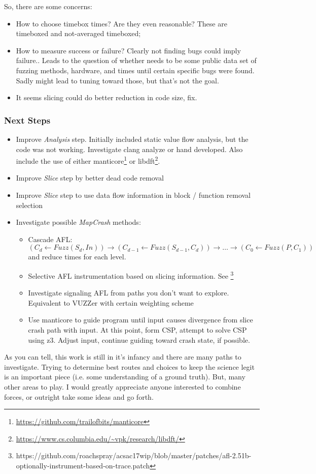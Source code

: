 \documentclass{beamer}
\begin{document}
{	
	So, there are some concerns:
	\begin{itemize}
	\item How to choose timebox times? Are they even reasonable? These are timeboxed and not-averaged timeboxed; 
	\item How to measure success or failure? Clearly not finding bugs could imply failure.. Leads to the question of whether
	needs to be some public data set of fuzzing methods, hardware, and times until certain specific bugs were found. Sadly might lead
	to tuning toward those, but that's not the goal.
	\item It seems slicing could do better reduction in code size, fix.
	\end{itemize}
}

\frame
{
	\frametitle{Next Steps}
	\tiny
	\begin{itemize}
	\item Improve \emph{Analysis} step. Initially included static value flow analysis, but the code was not working. Investigate clang analyze or hand developed. Also include the use of either manticore\footnote{\url{https://github.com/trailofbits/manticore}} or libdft\footnote{\url{https://www.cs.columbia.edu/~vpk/research/libdft/}}.
	\item Improve \emph{Slice} step by better dead code removal
	\item Improve \emph{Slice} step to use data flow information in block / function removal selection
	\item Investigate  possible \emph{MapCrash} methods:
	\begin{itemize}
	\tiny
	\item Cascade AFL: $(C_d \leftarrow Fuzz(S_d, In)) \rightarrow (C_{d-1} \leftarrow Fuzz(S_{d-1}, C_d)) \rightarrow \ldots \rightarrow (C_0 \leftarrow Fuzz(P, C_1))$ \\
	and reduce times for each level.
	
	\item Selective AFL instrumentation based on slicing information. See \footnote{https://github.com/roachspray/acsac17wip/blob/master/patches/afl-2.51b-optionally-instrument-based-on-trace.patch}
	\item Investigate signaling AFL from paths you don't want to explore. Equivalent to VUZZer with certain weighting scheme
	\item Use manticore to guide program until input causes divergence from slice crash path with input. At this point, form CSP, attempt
	to solve CSP using z3. Adjust input, continue guiding toward crash state, if possible. 
	\end{itemize}
	\end{itemize}
	As you can tell, this work is still in it's infancy and there are many paths to investigate. Trying to determine best routes and
	choices to keep the science legit is an important piece (i.e. some understanding of a ground truth). But, many other areas to play.
	I would greatly appreciate anyone interested to combine forces, or outright take some ideas and go forth.
	
}
\end{document}
